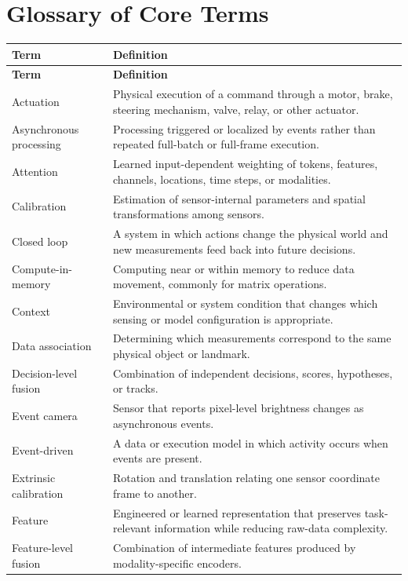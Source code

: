 \chapter{Glossary of Core Terms}
\label{app:glossary}

\begin{longtable}{@{}p{3.6cm}p{10.1cm}@{}}
\toprule
\textbf{Term} & \textbf{Definition} \\
\midrule
\endfirsthead
\toprule
\textbf{Term} & \textbf{Definition} \\
\midrule
\endhead
Actuation & Physical execution of a command through a motor, brake, steering mechanism, valve, relay, or other actuator. \\
Asynchronous processing & Processing triggered or localized by events rather than repeated full-batch or full-frame execution. \\
Attention & Learned input-dependent weighting of tokens, features, channels, locations, time steps, or modalities. \\
Calibration & Estimation of sensor-internal parameters and spatial transformations among sensors. \\
Closed loop & A system in which actions change the physical world and new measurements feed back into future decisions. \\
Compute-in-memory & Computing near or within memory to reduce data movement, commonly for matrix operations. \\
Context & Environmental or system condition that changes which sensing or model configuration is appropriate. \\
Data association & Determining which measurements correspond to the same physical object or landmark. \\
Decision-level fusion & Combination of independent decisions, scores, hypotheses, or tracks. \\
Event camera & Sensor that reports pixel-level brightness changes as asynchronous events. \\
Event-driven & A data or execution model in which activity occurs when events are present. \\
Extrinsic calibration & Rotation and translation relating one sensor coordinate frame to another. \\
Feature & Engineered or learned representation that preserves task-relevant information while reducing raw-data complexity. \\
Feature-level fusion & Combination of intermediate features produced by modality-specific encoders. \\

\end{longtable}
